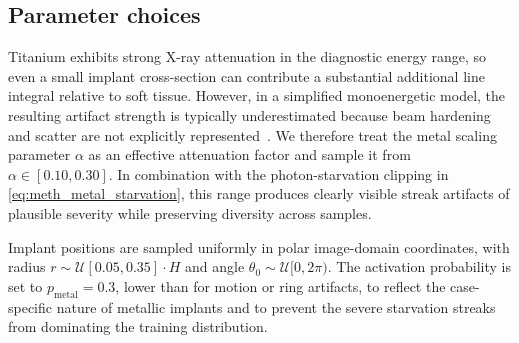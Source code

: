 \subsection{Parameter choices}

Titanium exhibits strong X-ray attenuation in the diagnostic energy range, so even a small implant cross-section can contribute a substantial additional line integral relative to soft tissue. However, in a simplified monoenergetic model, the resulting artifact strength is typically underestimated because beam hardening and scatter are not explicitly represented~\cite{Boas2012, Gjesteby2016}. We therefore treat the metal scaling parameter $\alpha$ as an effective attenuation factor and sample it from $\alpha \in [0.10, 0.30]$. In combination with the photon-starvation clipping in \eqref{eq:meth_metal_starvation}, this range produces clearly visible streak artifacts of plausible severity while preserving diversity across samples.

Implant positions are sampled uniformly in polar image-domain coordinates, with radius $r \sim \mathcal{U}[0.05, 0.35]\cdot H$ and angle $\theta_0 \sim \mathcal{U}[0, 2\pi)$. The activation probability is set to $p_\mathrm{metal}=0.3$, lower than for motion or ring artifacts, to reflect the case-specific nature of metallic implants and to prevent the severe starvation streaks from dominating the training distribution.

